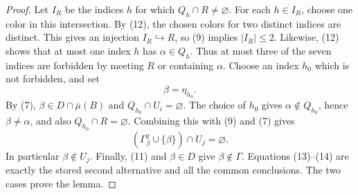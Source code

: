 \begin{proof}
Let \(I_R\) be the indices \(h\) for which \(Q_h\cap R\ne\varnothing\).
For each \(h\in I_R\), choose one color in this intersection.  By (12),
the chosen colors for two distinct indices are distinct.  This gives an
injection \(I_R\hookrightarrow R\), so (9) implies \(|I_R|\le2\).
Likewise, (12) shows that at most one index \(h\) has
\(\alpha\in Q_h\).  Thus at most three of the seven indices are forbidden
by meeting \(R\) or containing \(\alpha\).  Choose an index \(h_0\) which
is not forbidden, and set
\[
                              \beta=\eta_{h_0}.                 \tag{13}
\]
By (7), \(\beta\in D\cap\overline\mu(B)\) and
\(Q_{h_0}\cap U_i=\varnothing\).  The choice of \(h_0\) gives
\(\alpha\notin Q_{h_0}\), hence \(\beta\ne\alpha\), and also
\(Q_{h_0}\cap R=\varnothing\).  Combining this with (9) and (7) gives
\[
       (\Gamma^q_\beta\cup\{\beta\})\cap U_j=\varnothing.      \tag{14}
\]
In particular \(\beta\notin U_j\).  Finally, (11) and \(\beta\in D\)
give \(\beta\notin\Gamma\).  Equations (13)--(14) are exactly the stored
second alternative and all the common conclusions.  The two cases prove
the lemma.
\end{proof}
